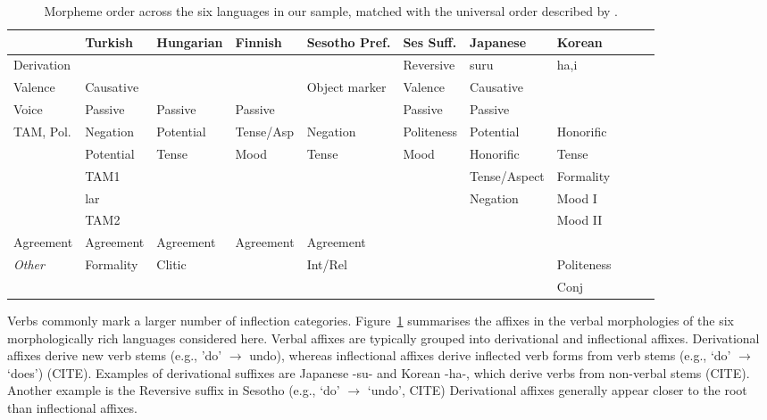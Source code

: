 \documentclass[11pt,letterpaper]{article}
\begin{document}
 
\begin{table}[]
    \centering
\begin{tabular}{l||l|l|l|l|l|l|llll}
                    & Turkish & Hungarian & Finnish  & Sesotho Pref.     & Ses Suff. & Japanese & Korean\\ \hline\hline
Derivation          &  &         &          &               & Reversive & suru    & ha,i\\ \hline
Valence             &  Causative &         &           & Object marker & Valence & Causative\\ \hline
Voice               & Passive & Passive    & Passive     &               & Passive & Passive\\ \hline
TAM, Pol.           & Negation  &   Potential  &   Tense/Asp &    Negation &  Politeness &      Potential        & Honorific \\
                    & Potential & Tense        &    Mood     &     Tense   &    Mood     &   Honorific  &    Tense       \\
                    &   TAM1    &          &                &         &                  & Tense/Aspect & Formality \\
                    & lar       &          &           &  & & Negation & Mood I\\
                    & TAM2         &           &               &          &       &      &  Mood II \\ \hline
Agreement           & Agreement & Agreement & Agreement & Agreement \\ \hline
\textit{Other}               & Formality          & Clitic    &              & Int/Rel &      &        & Politeness \\
                    &           &     &              &  &          &    & Conj \\
\end{tabular}
    \caption{Morpheme order across the six languages in our sample, matched with the universal order described by \cite{bybee-morphology-1985}.}
    \label{tab:table-orders}
\end{table}


Verbs commonly mark a larger number of inflection categories.
Figure~\ref{tab:table-orders} summarises the affixes in the verbal morphologies of the six morphologically rich languages considered here.
Verbal affixes are typically grouped into derivational and inflectional affixes.
Derivational affixes derive new verb stems (e.g., 'do' $\rightarrow$ undo), whereas inflectional affixes derive inflected verb forms from verb stems (e.g., `do' $\rightarrow$ `does') (CITE).
Examples of derivational suffixes are Japanese -su- and Korean -ha-, which derive verbs from non-verbal stems (CITE).
Another example is the Reversive suffix in Sesotho (e.g., `do' $\rightarrow$ `undo', CITE)
Derivational affixes generally appear closer to the root than inflectional affixes.
\end{document}
